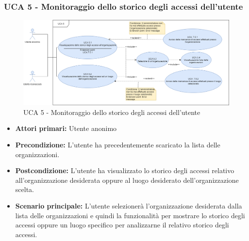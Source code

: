 \subsubsection{UCA 5 - Monitoraggio dello storico degli accessi dell'utente}
\begin{figure}[h]
	\centering	
	\includegraphics[scale=0.4, left]{sezioni/UseCase/Immagini/UCA5.png}
	\caption{UCA 5 - Monitoraggio dello storico degli accessi dell'utente}
\end{figure}

\begin{itemize}
    \item \textbf{Attori primari:} Utente anonimo
    \item \textbf{Precondizione:} L'utente ha precedentemente scaricato la lista delle organizzazioni.
    \item \textbf{Postcondizione:} L'utente ha visualizzato lo storico degli accessi relativo all'organizzazione desiderata oppure al luogo desiderato dell'organizzazione scelta.
    \item \textbf{Scenario principale:} L'utente selezionerà l'organizzazione desiderata dalla lista delle organizzazioni e quindi la funzionalità per mostrare lo storico degli accessi oppure un luogo specifico per analizzarne il relativo storico degli accessi.
\end{itemize}


